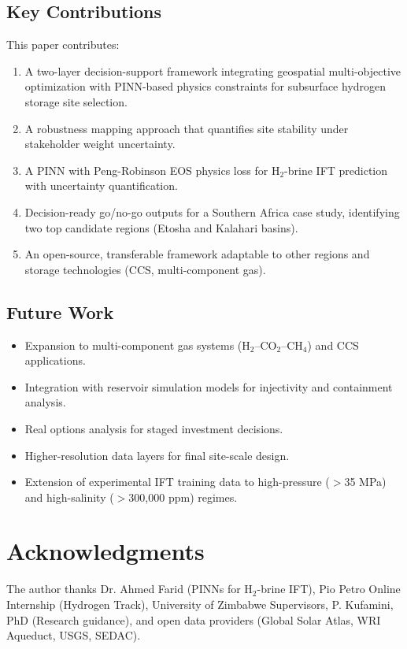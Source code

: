 \documentclass[11pt]{article}
\begin{document}
\subsection{Key Contributions}
This paper contributes:
\begin{enumerate}
    \item A two-layer decision-support framework integrating geospatial multi-objective optimization with PINN-based physics constraints for subsurface hydrogen storage site selection.
    \item A robustness mapping approach that quantifies site stability under stakeholder weight uncertainty.
    \item A PINN with Peng-Robinson EOS physics loss for H$_2$-brine IFT prediction with uncertainty quantification.
    \item Decision-ready go/no-go outputs for a Southern Africa case study, identifying two top candidate regions (Etosha and Kalahari basins).
    \item An open-source, transferable framework adaptable to other regions and storage technologies (CCS, multi-component gas).
\end{enumerate}

\subsection{Future Work}
\begin{itemize}
    \item Expansion to multi-component gas systems (H$_2$--CO$_2$--CH$_4$) and CCS applications.
    \item Integration with reservoir simulation models for injectivity and containment analysis.
    \item Real options analysis for staged investment decisions.
    \item Higher-resolution data layers for final site-scale design.
    \item Extension of experimental IFT training data to high-pressure ($>$35 MPa) and high-salinity ($>$300,000 ppm) regimes.
\end{itemize}

\section*{Acknowledgments}
The author thanks Dr. Ahmed Farid (PINNs for H$_2$-brine IFT), Pio Petro Online Internship (Hydrogen Track), University of Zimbabwe Supervisors, P. Kufamini, PhD (Research guidance), and open data providers (Global Solar Atlas, WRI Aqueduct, USGS, SEDAC).
\end{document}
